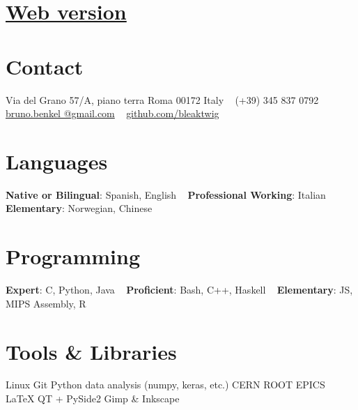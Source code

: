 \documentclass[a4paper]{cv-style}
\begin{document}
\lastupdated

\begin{aside}
    \section{\href{https://bleaktwig.github.io/cv/}{Web version}}
    \section{Contact}
        Via del Grano 57/A, piano terra
        Roma 00172
        Italy
        ~
        (+39) 345 837 0792
        ~
        \href{mailto:bruno.benkel@gmail.com}{bruno.benkel
        @gmail.com}
        ~
        \href{https://github.com/bleaktwig}{github.com/bleaktwig}
    \section{Languages}
        \textbf{Native or Bilingual}:
        Spanish, English
        ~
        \textbf{Professional Working}:
        Italian
        ~
        \textbf{Elementary}:
        Norwegian, Chinese
    \section{Programming}
        \textbf{Expert}:
        C, Python, Java
        ~
        \textbf{Proficient}:
        Bash, C++, Haskell
        ~
        \textbf{Elementary}:
        JS, MIPS Assembly, R
    \section{Tools \& Libraries}
        Linux
        Git
        Python data analysis (numpy, keras, etc.)
        CERN ROOT
        EPICS
        \LaTeX{}
        QT + PySide2
        Gimp \& Inkscape
\end{aside}

\end{document}
